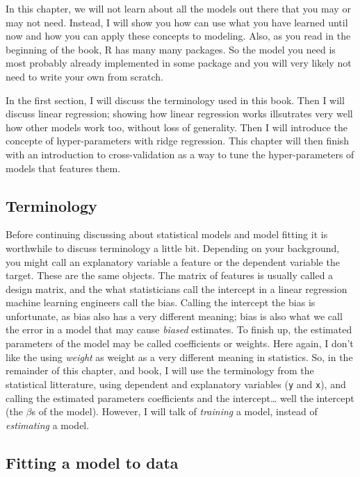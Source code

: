 \documentclass[]{gitbook}
\theoremstyle{definition}
\theoremstyle{definition}
\theoremstyle{definition}
\theoremstyle{remark}
\begin{document}
In this chapter, we will not learn about all the models out there that
you may or may not need. Instead, I will show you how can use what you
have learned until now and how you can apply these concepts to modeling.
Also, as you read in the beginning of the book, R has many many
packages. So the model you need is most probably already implemented in
some package and you will very likely not need to write your own from
scratch.

In the first section, I will discuss the terminology used in this book.
Then I will discuss linear regression; showing how linear regression
works illsutrates very well how other models work too, without loss of
generality. Then I will introduce the concepte of hyper-parameters with
ridge regression. This chapter will then finish with an introduction to
cross-validation as a way to tune the hyper-parameters of models that
features them.

\hypertarget{terminology}{%
\subsection{Terminology}\label{terminology}}

Before continuing discussing about statistical models and model fitting
it is worthwhile to discuss terminology a little bit. Depending on your
background, you might call an explanatory variable a feature or the
dependent variable the target. These are the same objects. The matrix of
features is usually called a design matrix, and the what statisticians
call the intercept in a linear regression machine learning engineers
call the bias. Calling the intercept the bias is unfortunate, as bias
also has a very different meaning; bias is also what we call the error
in a model that may cause \emph{biased} estimates. To finish up, the
estimated parameters of the model may be called coefficients or weights.
Here again, I don't like the using \emph{weight} as weight as a very
different meaning in statistics. So, in the remainder of this chapter,
and book, I will use the terminology from the statistical litterature,
using dependent and explanatory variables (\texttt{y} and \texttt{x}),
and calling the estimated parameters coefficients and the
intercept\ldots{} well the intercept (the \(\beta\)s of the model).
However, I will talk of \emph{training} a model, instead of
\emph{estimating} a model.

\hypertarget{fitting-a-model-to-data}{%
\subsection{Fitting a model to data}\label{fitting-a-model-to-data}}
\end{document}
